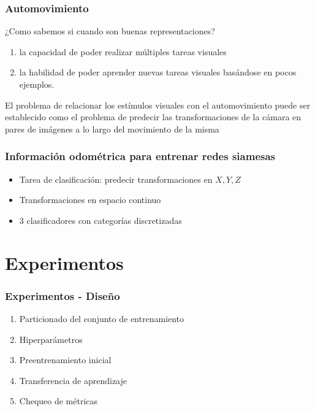 \documentclass{beamer}
\begin{document}
\begin{frame}
\frametitle{Automovimiento}

¿Como sabemos si cuando son buenas representaciones?\\\pause

\vfill
\begin{enumerate}
    \item la capacidad de poder realizar múltiples tareas visuales
    \item la habilidad de poder aprender nuevas tareas visuales basándose en pocos ejemplos.
\end{enumerate}\pause
\vfill

\begin{block}{}
El problema de relacionar los estímulos visuales con el automovimiento puede ser establecido como el problema de predecir las transformaciones de la cámara en pares de imágenes a lo largo del movimiento de la misma
\end{block}
\vfill
\end{frame}





\begin{frame}
\frametitle{Información odométrica para entrenar redes siamesas}
\begin{itemize}
    \item Tarea de clasificación: predecir transformaciones en \(X, Y, Z\)
    \item Transformaciones en espacio continuo 
    \item 3 clasificadores con categorías discretizadas
\end{itemize}
\end{frame}





\section{Experimentos}
\begin{frame}
\frametitle{Experimentos - Diseño}
\begin{enumerate}
    \item Particionado del conjunto de entrenamiento
    \item Hiperparámetros
    \item Preentrenamiento inicial
    \item Transferencia de aprendizaje
    \item Chequeo de métricas
\end{enumerate}
\end{frame}
\end{document}
